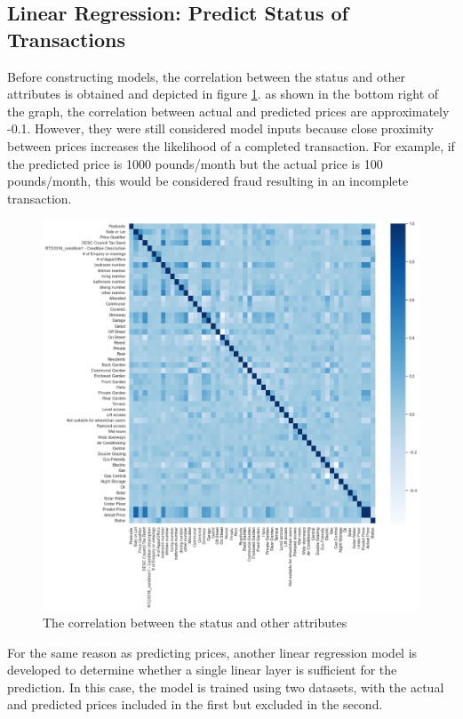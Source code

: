 \documentclass[12pt,twoside]{report}
\begin{document}
\subsection{Linear Regression: Predict Status of Transactions}
Before constructing models, the correlation between the status and other attributes is obtained and depicted in figure \ref{correlation_status}. as shown in the bottom right of the graph, the correlation between actual and predicted prices are approximately -0.1. However, they were still considered model inputs because close proximity between prices increases the likelihood of a completed transaction. For example, if the predicted price is 1000 pounds/month but the actual price is 100 pounds/month, this would be considered fraud resulting in an incomplete transaction. 

\begin{figure}[!htbp]
	\centering
	\includegraphics[width=15cm]{correlation_status}
	\caption{The correlation between the status and other attributes}
	\label{correlation_status}
\end{figure}

For the same reason as predicting prices, another linear regression model is developed to determine whether a single linear layer is sufficient for the prediction. In this case, the model is trained using two datasets, with the actual and predicted prices included in the first but excluded in the second. 
\end{document}
